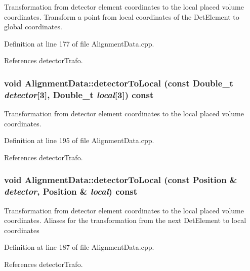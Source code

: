 Transformation from detector element coordinates to the local placed volume coordinates. Transform a point from local coordinates of the DetElement to global coordinates. 

Definition at line 177 of file AlignmentData.cpp.

References detectorTrafo.\hypertarget{class_d_d4hep_1_1_alignments_1_1_alignment_data_a09f3122d269494dd949cc20d141b3fd2}{
\subsubsection[{detectorToLocal}]{\setlength{\rightskip}{0pt plus 5cm}void AlignmentData::detectorToLocal (const Double\_\-t {\em detector}\mbox{[}3\mbox{]}, \/  Double\_\-t {\em local}\mbox{[}3\mbox{]}) const}}
\label{class_d_d4hep_1_1_alignments_1_1_alignment_data_a09f3122d269494dd949cc20d141b3fd2}


Transformation from detector element coordinates to the local placed volume coordinates. 

Definition at line 195 of file AlignmentData.cpp.

References detectorTrafo.\hypertarget{class_d_d4hep_1_1_alignments_1_1_alignment_data_a8b451ea84d324b3c37f6569d6fd86062}{
\subsubsection[{detectorToLocal}]{\setlength{\rightskip}{0pt plus 5cm}void AlignmentData::detectorToLocal (const Position \& {\em detector}, \/  Position \& {\em local}) const}}
\label{class_d_d4hep_1_1_alignments_1_1_alignment_data_a8b451ea84d324b3c37f6569d6fd86062}


Transformation from detector element coordinates to the local placed volume coordinates. Aliases for the transformation from the next DetElement to local coordinates 

Definition at line 187 of file AlignmentData.cpp.

References detectorTrafo.

